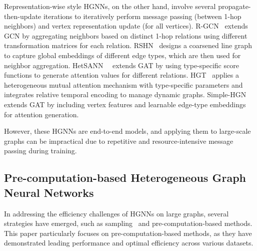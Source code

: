\documentclass[lettersize,journal]{IEEEtran}
\begin{document}
Representation-wise style HGNNs, on the other hand, involve several propagate-then-update iterations to iteratively perform message passing (between 1-hop neighbors) and vertex representation update (for all vertices). 
R-GCN~\cite{DBLP:conf/esws/SchlichtkrullKB18} extends GCN by aggregating neighbors based on distinct 1-hop relations using different transformation matrices for each relation. 
RSHN~\cite{DBLP:conf/icdm/ZhuZPZW19} designs a coarsened line graph to capture global embeddings of different edge types, which are then used for neighbor aggregation. 
HetSANN~~\cite{DBLP:conf/aaai/HongGLYLY20} extends GAT by using type-specific score functions to generate attention values for different relations. 
HGT~\cite{DBLP:conf/www/HuDWS20} applies a heterogeneous mutual attention mechanism with type-specific parameters and integrates relative temporal encoding to manage dynamic graphs. 
Simple-HGN~\cite{DBLP:conf/kdd/LvDLCFHZJDT21} extends GAT by including vertex features and learnable edge-type embeddings for attention generation.



However, these HGNNs are end-to-end models, and applying them to large-scale graphs can be impractical due to repetitive and resource-intensive message passing during training.













\subsection{Pre-computation-based Heterogeneous Graph Neural Networks}

In addressing the efficiency challenges of HGNNs on large graphs, several strategies have emerged, such as sampling~\cite{DBLP:conf/kdd/YingHCEHL18,DBLP:conf/kdd/JiangJFSLW21} and pre-computation-based methods.
This paper particularly focuses on pre-computation-based methods, as they have demonstrated leading performance and optimal efficiency across various datasets.
\end{document}

